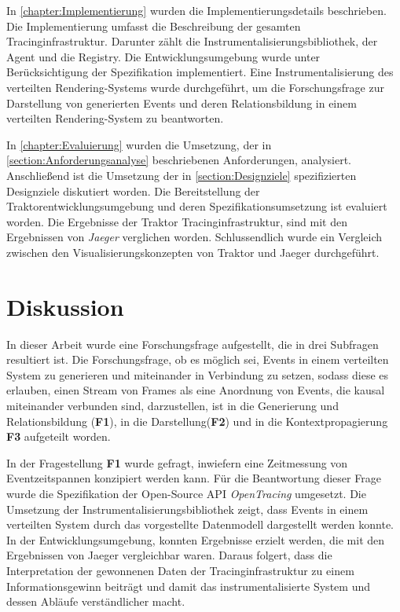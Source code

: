 In \cref{chapter:Implementierung} wurden die Implementierungsdetails beschrieben. Die Implementierung umfasst die Beschreibung der gesamten Tracinginfrastruktur. Darunter zählt die Instrumentalisierungsbibliothek, der Agent und die Registry. Die Entwicklungsumgebung wurde unter Berücksichtigung der Spezifikation implementiert. Eine Instrumentalisierung des verteilten Rendering-Systems wurde durchgeführt, um die Forschungsfrage zur Darstellung von generierten Events und deren Relationsbildung in einem verteilten Rendering-System zu beantworten.

In \cref{chapter:Evaluierung} wurden die Umsetzung, der in \cref{section:Anforderungsanalyse} beschriebenen Anforderungen, analysiert. Anschließend ist die Umsetzung der in \cref{section:Designziele} spezifizierten Designziele diskutiert worden. Die Bereitstellung der Traktorentwicklungsumgebung und deren Spezifikationsumsetzung ist evaluiert worden. Die Ergebnisse der Traktor Tracinginfrastruktur, sind mit den Ergebnissen von \emph{Jaeger} verglichen worden. Schlussendlich wurde ein Vergleich zwischen den Visualisierungskonzepten von Traktor und Jaeger durchgeführt.

\section{Diskussion}
\label{Diskussion}

In dieser Arbeit wurde eine Forschungsfrage aufgestellt, die in drei Subfragen resultiert ist. Die Forschungsfrage, ob es möglich sei, Events in einem verteilten System zu generieren und miteinander in Verbindung zu setzen, sodass diese es erlauben, einen Stream von Frames als eine Anordnung von Events, die kausal miteinander verbunden sind, darzustellen, ist in die Generierung und Relationsbildung (\textbf{F1}), in die Darstellung(\textbf{F2}) und in die Kontextpropagierung \textbf{F3} aufgeteilt worden.


In der Fragestellung \textbf{F1} wurde gefragt, inwiefern eine Zeitmessung von Eventzeitspannen konzipiert werden kann. Für die Beantwortung dieser Frage wurde die Spezifikation der Open-Source API \emph{OpenTracing} umgesetzt. Die Umsetzung der Instrumentalisierungsbibliothek zeigt, dass Events in einem verteilten System durch das vorgestellte Datenmodell dargestellt werden konnte. In der Entwicklungsumgebung, konnten Ergebnisse erzielt werden, die mit den Ergebnissen von Jaeger vergleichbar waren. Daraus folgert, dass die Interpretation der gewonnenen Daten der Tracinginfrastruktur zu einem Informationsgewinn beiträgt und damit das instrumentalisierte System und dessen Abläufe verständlicher macht.


